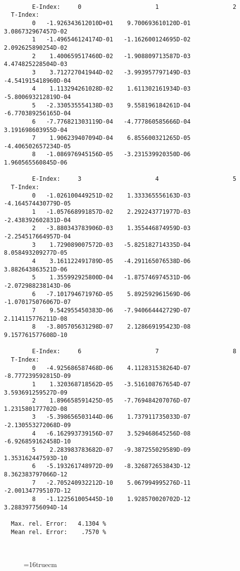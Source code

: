 \documentclass[12pt,dvipdfmx]{article}
\begin{document}
\begin{small}\begin{verbatim}

        E-Index:     0                     1                     2
  T-Index:
        0   -1.926343612010D+01    9.700693610120D-01    3.086732967457D-02
        1   -1.496546124174D-01   -1.162600124695D-02    2.092625890254D-02
        2    1.400659517460D-02   -1.908809713587D-03    4.474825228504D-03
        3    3.712727041944D-02   -3.993957797149D-03   -4.541915418960D-04
        4    1.113294261028D-02    1.611302161934D-03   -5.800693212819D-04
        5   -2.330535554138D-03    9.558196184261D-04   -6.770389256165D-04
        6   -7.776821303119D-04   -4.777860585666D-04    3.191698603955D-04
        7    1.906239407094D-04    6.855600321265D-05   -4.406502657234D-05
        8   -1.086976945156D-05   -3.231539920350D-06    1.960565560845D-06

        E-Index:     3                     4                     5
  T-Index:
        0   -1.026100449251D-02    1.333365556163D-03   -4.164574430779D-05
        1   -1.057668991857D-02    2.292243771977D-03   -2.438392602831D-04
        2   -3.880343783906D-03    1.355446874959D-03   -2.254517664957D-04
        3    1.729089007572D-03   -5.825182714335D-04    8.058493209277D-05
        4    3.161122491789D-05   -4.291165076538D-06    3.882643863521D-06
        5    1.355992925800D-04   -1.875746974531D-06   -2.072988238143D-06
        6   -7.101794671976D-05    5.892592961569D-06   -1.070175076067D-07
        7    9.542955450383D-06   -7.940664442729D-07    2.114115776211D-08
        8   -3.805705631298D-07    2.128669195423D-08    9.157761577608D-10

        E-Index:     6                     7                     8
  T-Index:
        0   -4.925686587468D-06    4.112831538264D-07   -8.777239592815D-09
        1    1.320368718562D-05   -3.516108767654D-07    3.593691259527D-09
        2    1.896658591425D-05   -7.769484207076D-07    1.231580177702D-08
        3   -5.398656503144D-06    1.737911735033D-07   -2.130553272068D-09
        4   -6.162993739156D-07    3.529468645256D-08   -6.926859162458D-10
        5    2.283983783682D-07   -9.387255029589D-09    1.353162447593D-10
        6   -5.193261748972D-09   -8.326872653843D-12    8.362383797066D-12
        7   -2.705240932212D-10    5.067994995276D-11   -2.001347795107D-12
        8   -1.122561005445D-10    1.928570020702D-12    3.288397756094D-14

  Max. rel. Error:   4.1304 %
  Mean rel. Error:    .7570 %



\end{verbatim}\end{small}
\begin{figure} \label{7.2b}
\epsfxsize=16truecm
\end{figure}
\newpage
\end{document}
